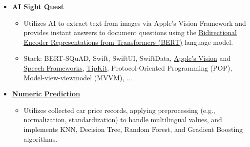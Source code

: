 \documentclass[letter,10pt]{article}
\newcommand{\customsquare}{\raisebox{0.25ex}{\scalebox{0.45}{$\blacksquare$}}}
\begin{document}
\begin{itemize}[label={\customsquare}]
    \item \href{https://github.com/karami-mehdi/AISightQuest}{\underline{\textbf{AI Sight Quest}}}
    \begin{itemize}
        \item Utilizes AI to extract text from images via Apple's Vision Framework and provides instant answers to document questions using the \href{https://arxiv.org/abs/1810.04805}{\underline{Bidirectional Encoder Representations from Transformers (BERT)}} language model.
        \item Stack: BERT-SQuAD, Swift, SwiftUI, SwiftData, \href{https://developer.apple.com/documentation/vision}{\underline{Apple's Vision}} and \href{https://developer.apple.com/documentation/speech}{\underline{Speech Frameworks}}, \href{https://developer.apple.com/documentation/tipkit}{\underline{TipKit}}, Protocol-Oriented Programming (POP), Model-view-viewmodel (MVVM), ...
    \end{itemize}
    \newpage
    \item \href{https://github.com/karami-mehdi/TodayILearned/tree/main/DataMining}{\underline{\textbf{Numeric Prediction}}}
    \begin{itemize}
        \item Utilizes collected car price records, applying preprocessing (e.g., normalization, standardization) to handle multilingual values, and implements KNN, Decision Tree, Random Forest, and Gradient Boosting algorithms.
    \end{itemize}




\end{itemize}
\end{document}

